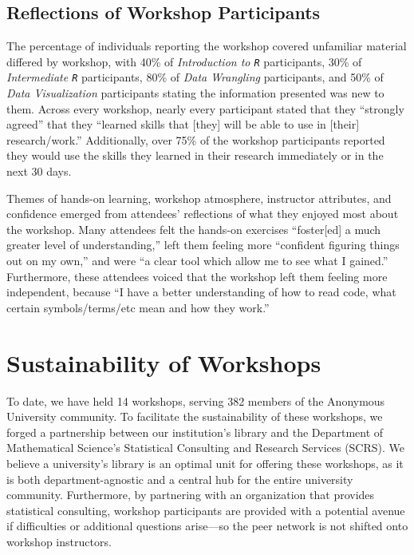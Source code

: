 \documentclass[12pt]{article}
\begin{document}

\subsection{Reflections of Workshop Participants} 

\noindent The percentage of individuals reporting the workshop covered 
unfamiliar material differed by workshop, with 40\% of \emph{Introduction
to \texttt{R}} participants, 30\% of \emph{Intermediate \texttt{R}}
participants, 80\% of \emph{Data Wrangling} participants, and 50\% of 
\emph{Data Visualization} participants stating the information presented was
new to them. Across every workshop, nearly every participant stated that they
``strongly agreed'' that they ``learned skills that [they] will be able to use
in [their] research/work.'' Additionally, over 75\% of the workshop participants
reported they would use the skills they learned in their research immediately or
in the next 30 days. 

\quad Themes of hands-on learning, workshop atmosphere, instructor attributes,
and confidence emerged from attendees' reflections of what they enjoyed most
about the workshop. Many attendees felt the hands-on exercises ``foster[ed] a
much greater level of understanding,'' left them feeling more ``confident
figuring things out on my own,'' and were ``a clear tool which allow me to see
what I gained.'' Furthermore, these attendees voiced that the workshop left them
feeling more independent, because ``I have a better understanding of how to read
code, what certain symbols/terms/etc mean and how they work.'' 

\section{Sustainability of Workshops}  
\label{sec:sustainability}

To date, we have held 14 workshops, serving 382 members of the Anonymous    
University community. To facilitate the sustainability of these workshops, we
forged a partnership between our institution's library and the Department of
Mathematical Science's Statistical Consulting and Research Services (SCRS). We
believe a university's library is an optimal unit for offering these workshops,
as it is both department-agnostic and a central hub for the entire university
community. Furthermore, by partnering with an organization that provides
statistical consulting, workshop participants are provided with a potential
avenue if difficulties or additional questions arise---so the peer network is
not shifted onto workshop instructors. 
\end{document}
